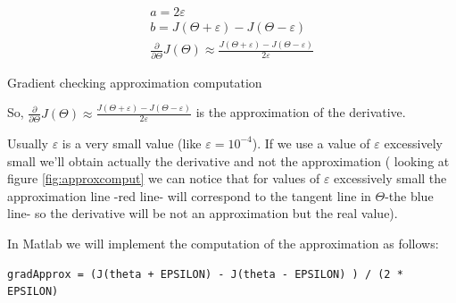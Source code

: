 \begin{eqfloat}[H]
\begin{equation}
	\begin{aligned}
	a = 2 \varepsilon \\
	b = J(\Theta + \varepsilon) - J(\Theta - \varepsilon)\\
	\frac{\partial}{\partial \Theta} J(\Theta) \approx \frac{J(\Theta + \varepsilon) - J(\Theta - \varepsilon)}{2 \varepsilon}
	\end{aligned}	
\end{equation}
      \addtocounter{equation}{-1}
        \caption{ Gradient checking approximation computation}
        \label{eq:approxcomput}
    \end{eqfloat}

So, $ 	\frac{\partial}{\partial \Theta} J(\Theta) \approx \frac{J(\Theta + \varepsilon) - J(\Theta - \varepsilon)}{2 \varepsilon}
$ is the approximation of the derivative.

Usually $\varepsilon$ is a very small value (like $\varepsilon = 10^{-4}$). If we use a value of $\varepsilon$ excessively small we'll obtain actually the derivative and not the approximation ( looking at figure \ref{fig:approxcomput} we can notice that for values of  $\varepsilon$ excessively small the approximation line -red line- will correspond to the tangent line in $\Theta$-the blue line- so the derivative will be not an approximation but the real value).

In Matlab we will implement the computation of the approximation as follows:


\begin{mdframed}[style=MyFrame]
\begin{lstlisting}
gradApprox = (J(theta + EPSILON) - J(theta - EPSILON) ) / (2 *  EPSILON) 
\end{lstlisting}
\end{mdframed}

